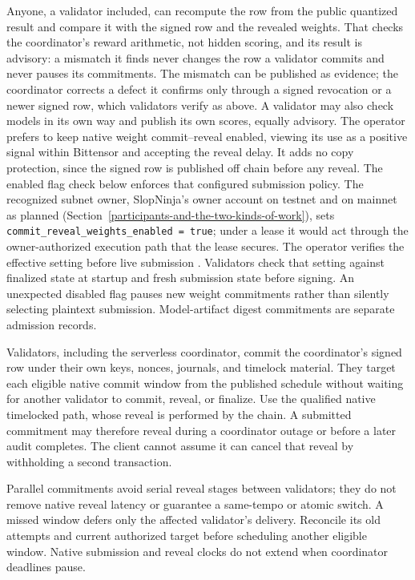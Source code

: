Anyone, a validator included, can recompute the row from the public quantized
result and compare it with the signed row and the revealed weights. That checks
the coordinator's reward arithmetic, not hidden scoring, and its result is
advisory: a mismatch it finds never changes the row a validator commits and
never pauses its commitments. The mismatch can be published as evidence; the
coordinator corrects a defect it confirms only through a signed revocation or a
newer signed row, which validators verify as above. A validator may also
check models in its own way and publish its own scores, equally advisory. The
operator prefers to keep native weight commit--reveal enabled, viewing its use
as a positive signal within Bittensor and accepting the reveal delay. It adds
no copy protection, since the signed row is published off chain before any
reveal.
The enabled flag check below enforces that configured submission policy.
The recognized subnet owner, SlopNinja's owner account on testnet and on
mainnet as planned (Section~\ref{participants-and-the-two-kinds-of-work}), sets
\texttt{commit\_reveal\_weights\_enabled = true}; under a lease it would act
through the owner-authorized execution path that the lease secures. The
operator verifies the effective setting before live submission
\cite{weightsubmissionmode,commitreveal}. Validators check that setting against
finalized state at startup and fresh submission state before signing. An
unexpected disabled flag pauses new weight commitments rather than silently
selecting plaintext submission. Model-artifact digest commitments are separate
admission records.

Validators, including the serverless coordinator, commit the coordinator's
signed row under their own keys, nonces, journals, and timelock
material. They target each eligible native commit window from the published
schedule without waiting for another validator to commit, reveal, or finalize.
Use the qualified native timelocked path, whose reveal is performed by the chain.
A submitted commitment may therefore reveal during a coordinator outage or
before a later audit completes. The client cannot assume it can cancel that
reveal by withholding a second transaction.

Parallel commitments avoid serial reveal stages between validators; they do not
remove native reveal latency or guarantee a same-tempo or atomic switch. A missed
window defers only the affected validator's delivery. Reconcile its old attempts
and current authorized target before scheduling another eligible window. Native
submission and reveal clocks do not extend when coordinator deadlines pause.

